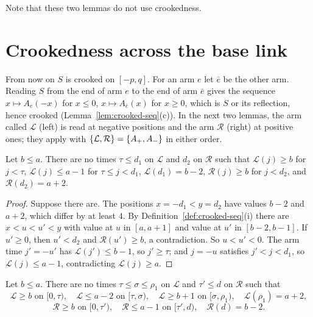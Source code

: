 
Note that these two lemmas do not use crookedness.

\section{Crookedness across the base link}\label{sec:fold-cores}

From now on $S$ is crooked on $[-p,q]$. For an arm $e$ let $\bar e$ be the other arm. Reading $S$ from the end of arm $e$ to the
end of arm $\bar e$ gives the sequence $x\mapsto A_e(-x)$ for $x\le0$, $x\mapsto A_{\bar e}(x)$ for $x\ge0$, which is $S$ or its
reflection, hence crooked (Lemma~\ref{lem:crooked-seq}(c)). In the next two lemmas, the arm called $\mathcal L$ (left) is read at
negative positions and the arm $\mathcal R$ (right) at positive ones; they apply with $\left\{ \mathcal L,\mathcal R \right\}=\left\{ A_+,A_- \right\}$ in
either order.

\begin{lemma}[Up core]\label{lem:up-core}
Let $b\le a$. There are no times $\tau\le d_1$ on $\mathcal L$ and $d_2$ on $\mathcal R$ such that $\mathcal L(j)\ge b$ for $j<\tau$,
$\mathcal L(j)\le a-1$ for $\tau\le j<d_1$, $\mathcal L(d_1)=b-2$, $\mathcal R(j)\ge b$ for $j<d_2$, and $\mathcal R(d_2)=a+2$.
\end{lemma}

\begin{proof}
Suppose there are. The positions $x=-d_1<y=d_2$ have values $b-2$ and $a+2$, which differ by at least $4$. By
Definition~\ref{def:crooked-seq}(i) there are $x<u<u'<y$ with value at $u$ in $[a,a+1]$ and value at $u'$ in $[b-2,b-1]$. If $u'\ge0$,
then $u'<d_2$ and $\mathcal R(u')\ge b$, a contradiction. So $u<u'<0$. The arm time $j'=-u'$ has $\mathcal L(j')\le b-1$, so $j'\ge\tau$;
and $j=-u$ satisfies $j'<j<d_1$, so $\mathcal L(j)\le a-1$, contradicting $\mathcal L(j)\ge a$.
\end{proof}


\begin{lemma}\label{lem:down-core}
Let $b\le a$. There are no times $\tau\le\sigma\le\rho_1$ on $\mathcal L$ and $\tau'\le d$ on $\mathcal R$ such that
\[
\mathcal L\ge b\text{ on }[0,\tau),\quad \mathcal L\le a-2\text{ on }[\tau,\sigma),\quad \mathcal L\ge b+1\text{ on }[\sigma,\rho_1),\quad
\mathcal L(\rho_1)=a+2,
\]
\[
\mathcal R\ge b\text{ on }[0,\tau'),\quad\mathcal R\le a-1\text{ on }[\tau',d),\quad\mathcal R(d)=b-2 .
\]
\end{lemma}

